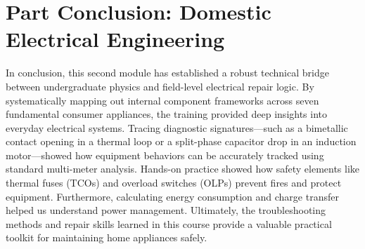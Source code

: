 \documentclass[11pt,a4paper]{report}
\begin{document}
\chapter*{Part Conclusion: Domestic Electrical Engineering}
In conclusion, this second module has established a robust technical bridge between undergraduate physics and field-level electrical repair logic. By systematically mapping out internal component frameworks across seven fundamental consumer appliances, the training provided deep insights into everyday electrical systems. Tracing diagnostic signatures—such as a bimetallic contact opening in a thermal loop or a split-phase capacitor drop in an induction motor—showed how equipment behaviors can be accurately tracked using standard multi-meter analysis. Hands-on practice showed how safety elements like thermal fuses (TCOs) and overload switches (OLPs) prevent fires and protect equipment. Furthermore, calculating energy consumption and charge transfer helped us understand power management. Ultimately, the troubleshooting methods and repair skills learned in this course provide a valuable practical toolkit for maintaining home appliances safely.
\end{document}
